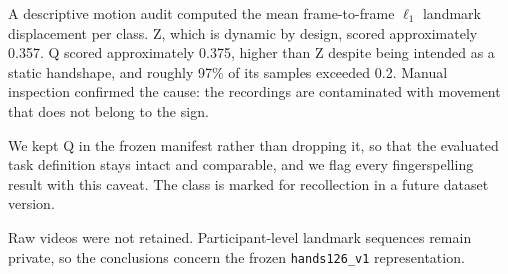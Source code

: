 A descriptive motion audit computed the mean frame-to-frame $\ell_1$
landmark displacement per class. Z, which is dynamic by design, scored
approximately 0.357. Q scored approximately 0.375, higher than Z despite
being intended as a static handshape, and roughly 97\% of its samples
exceeded 0.2. Manual inspection confirmed the cause: the
recordings are contaminated with movement that does not belong to the
sign.

We kept Q in the frozen manifest rather than dropping it, so that the
evaluated task definition stays intact and comparable, and we flag every
fingerspelling result with this caveat. The class is marked for
recollection in a future dataset version.

Raw videos were not retained. Participant-level landmark sequences
remain private, so the conclusions concern the frozen
\texttt{hands126\_v1} representation.